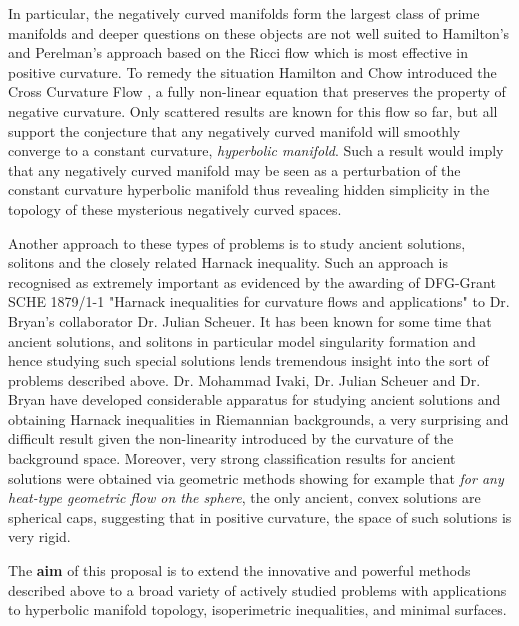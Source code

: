 \documentclass[12pt]{amsart}
\begin{document}
In particular, the negatively curved manifolds form the largest class of prime manifolds and deeper questions on these objects are not well suited to Hamilton's and Perelman's approach based on the Ricci flow which is most effective in positive curvature. To remedy the situation Hamilton and Chow introduced the Cross Curvature Flow \cite{MR2055396}, a fully non-linear equation that preserves the property of negative curvature. Only scattered results are known for this flow so far, but all support the conjecture that any negatively curved manifold will smoothly converge to a constant curvature, \emph{hyperbolic manifold}. Such a result would imply that any negatively curved manifold may be seen as a perturbation of the constant curvature hyperbolic manifold thus revealing hidden simplicity in the topology of these mysterious negatively curved spaces.

Another approach to these types of problems is to study ancient solutions, solitons and the closely related Harnack inequality. Such an approach is recognised as extremely important as evidenced by the awarding of DFG-Grant SCHE 1879/1-1 "Harnack inequalities for curvature flows and applications" to Dr. Bryan's collaborator Dr. Julian Scheuer. It has been known for some time that ancient solutions, and solitons in particular model singularity formation and hence studying such special solutions lends tremendous insight into the sort of problems described above. Dr. Mohammad Ivaki, Dr. Julian Scheuer and Dr. Bryan have developed considerable apparatus \cite{BIS4,2016arXiv160401694B,2015arXiv150802821B,2015arXiv151203374B} for studying ancient solutions and obtaining Harnack inequalities in Riemannian backgrounds, a very surprising and difficult result given the non-linearity introduced by the curvature of the background space. Moreover, very strong classification results for ancient solutions were obtained via geometric methods showing for example that \emph{for any heat-type geometric flow on the sphere}, the only ancient, convex solutions are spherical caps, suggesting that in positive curvature, the space of such solutions is very rigid.

The \textbf{aim} of this proposal is to extend the innovative and powerful methods described above to a broad variety of actively studied problems with applications to hyperbolic manifold topology, isoperimetric inequalities, and minimal surfaces.
\end{document}
